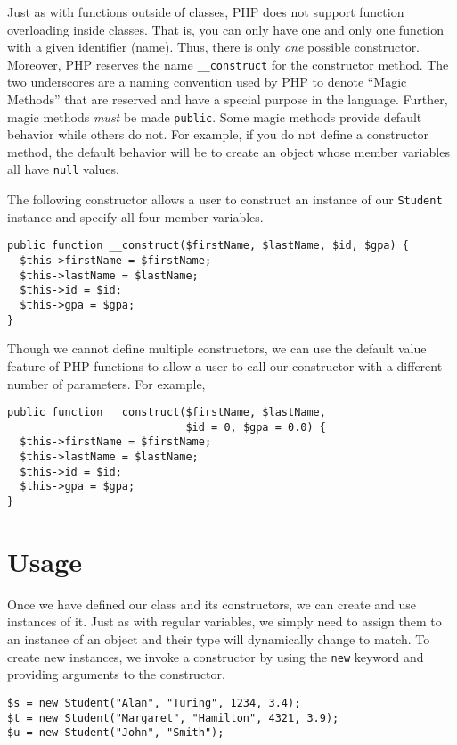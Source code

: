 Just as with functions outside of classes, PHP does not support 
function overloading inside classes.  That is, you can only have
one and only one function with a given identifier (name).  Thus,
there is only \emph{one} possible constructor.  Moreover, PHP 
reserves the name \texttt{__construct} for the constructor
method.  The two underscores are a naming convention used by PHP
to denote ``Magic Methods'' that are reserved and have a special
purpose in the language.  Further, magic methods \emph{must} be
made \texttt{public}.  Some magic methods provide default
behavior while others do not.  For example, if you do not
define a constructor method, the default behavior will be to
create an object whose member variables all have \texttt{null} values.  

The following constructor allows a user to construct an instance of
our \texttt{Student} instance and specify all four member 
variables.

\begin{verbatim}
public function __construct($firstName, $lastName, $id, $gpa) {
  $this->firstName = $firstName;
  $this->lastName = $lastName;
  $this->id = $id;
  $this->gpa = $gpa;
}
\end{verbatim}

Though we cannot define multiple constructors, we can use the 
default value feature of PHP functions to allow a user to call our
constructor with a different number of parameters.  For example, 

\begin{verbatim}
public function __construct($firstName, $lastName, 
                            $id = 0, $gpa = 0.0) {
  $this->firstName = $firstName;
  $this->lastName = $lastName;
  $this->id = $id;
  $this->gpa = $gpa;
}
\end{verbatim}

\section{Usage}

Once we have defined our class and its constructors, we can 
create and use instances of it.  Just as with regular variables, 
we simply need to assign them to an instance of an object and
their type will dynamically change to match.  To create new
instances, we invoke a constructor by using the \texttt{new} 
keyword and providing arguments to the constructor.

\begin{verbatim}
$s = new Student("Alan", "Turing", 1234, 3.4);
$t = new Student("Margaret", "Hamilton", 4321, 3.9);
$u = new Student("John", "Smith");
\end{verbatim}

